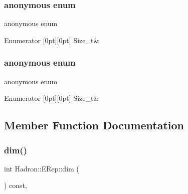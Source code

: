 \subsubsection{\texorpdfstring{anonymous enum}{anonymous enum}}
{\footnotesize\ttfamily anonymous enum}

\begin{DoxyEnumFields}{Enumerator}
[0pt][0pt]{}\mbox{\label{structHadron_1_1ERep_a8021dea2662ee2c6c294e5f2993d2f47acb7bf608d071c4d879c9a0e2af9f2d76}} 
Size\+\_\+t&\\
\hline

\end{DoxyEnumFields}
\mbox{\label{structHadron_1_1ERep_ad62f3c21cb334a8e25e780ddc27f917c}} 
\subsubsection{\texorpdfstring{anonymous enum}{anonymous enum}}
{\footnotesize\ttfamily anonymous enum}

\begin{DoxyEnumFields}{Enumerator}
[0pt][0pt]{}\mbox{\label{structHadron_1_1ERep_a8021dea2662ee2c6c294e5f2993d2f47acb7bf608d071c4d879c9a0e2af9f2d76}} 
Size\+\_\+t&\\
\hline

\end{DoxyEnumFields}


\subsection{Member Function Documentation}
\mbox{\label{structHadron_1_1ERep_a9eba7fc8ee0562900e00c0755337f103}} 
\subsubsection{\texorpdfstring{dim()}{dim()}\hspace{0.1cm}{\footnotesize\ttfamily [1/3]}}
{\footnotesize\ttfamily int Hadron\+::\+E\+Rep\+::dim (\begin{DoxyParamCaption}{ }\end{DoxyParamCaption}) const\hspace{0.3cm}{\ttfamily [inline]}, {\ttfamily [virtual]}}



